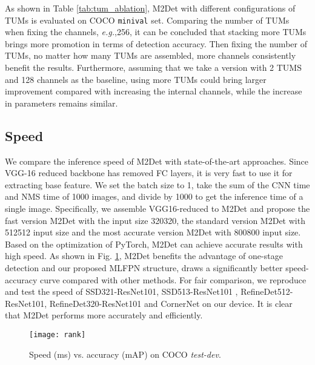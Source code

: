 \documentclass[letterpaper]{article} \usepackage{aaai18}  \usepackage{times}  \usepackage{helvet}  \usepackage{courier}  \usepackage{url}  \usepackage{graphicx}
\begin{document}
As shown in Table \ref{tab:tum_ablation}, M2Det with different configurations of TUMs is evaluated on COCO \texttt{minival} set. Comparing the number of TUMs when fixing the channels, \textit{e.g.},256, it can be concluded that stacking more TUMs brings more promotion in terms of detection accuracy. Then fixing the number of TUMs, no matter how many TUMs are assembled, more channels consistently benefit the results. Furthermore, assuming that we take a version with 2 TUMS and 128 channels as the baseline, using more TUMs could bring larger improvement compared with increasing the internal channels, while the increase in parameters remains similar.


\subsection{Speed}
We compare the inference speed of M2Det with state-of-the-art approaches. Since VGG-16 \cite{SimonyanZ14a} reduced backbone has removed FC layers, it is very fast to use it for extracting base feature. We set the batch size to 1, take the sum of the CNN time and NMS time of 1000 images, and divide by 1000 to get the inference time of a single image. Specifically, we assemble VGG16-reduced to M2Det and propose the fast version M2Det with the input size 320320, the standard version M2Det with 512512 input size and the most accurate version M2Det with 800800 input size. Based on the optimization of PyTorch, M2Det can achieve accurate results with high speed. As shown in Fig. \ref{fig:rank}, M2Det benefits the advantage of one-stage detection and our proposed MLFPN structure, draws a significantly better speed-accuracy curve compared with other methods. For fair comparison, we reproduce and test the speed of SSD321-ResNet101, SSD513-ResNet101 \cite{FuLRTB17}, RefineDet512-ResNet101, RefineDet320-ResNet101 \cite{abs-1711-06897} and CornerNet \cite{abs-1808-01244} on our device. It is clear that M2Det performs more accurately and efficiently.

\begin{figure}[t]
\centering
\texttt{[image: rank]}
\caption{Speed (ms) vs. accuracy (mAP) on COCO \textit{test-dev}.}
\label{fig:rank}
\end{figure}
\end{document}
